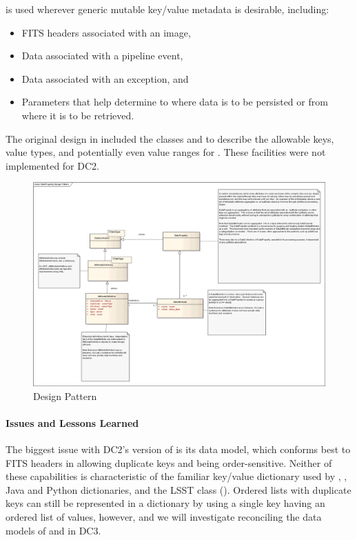  is used wherever generic mutable key/value metadata
is desirable, including:
\begin{itemize}
\item FITS headers associated with an image,
\item Data associated with a pipeline event,
\item Data associated with an exception, and
\item Parameters that help determine to where data is to be persisted
or from where it is to be retrieved.
\end{itemize}

The original  design in 
included the classes  and  
to describe the allowable keys, value types, and potentially even value
ranges for .  These facilities were not implemented for
DC2.

\begin{figure}[htbp]
\includegraphics[width=\textwidth]{figures/DataPropertyDesign.png}
\caption{ Design Pattern}
\label{dataproperty-design}
\end{figure}


\paragraph{Issues and Lessons Learned}

The biggest issue with DC2's version of  is its data model,
which conforms best to FITS headers in allowing duplicate keys and being
order-sensitive.  Neither of these capabilities is characteristic of
the familiar key/value dictionary 
used by , , Java and Python
dictionaries, and the LSST  class (). 
Ordered lists with duplicate keys can still be represented 
in a dictionary by using a single key
having an ordered list of values, however, and we will investigate reconciling the
data models of  and  in DC3.

